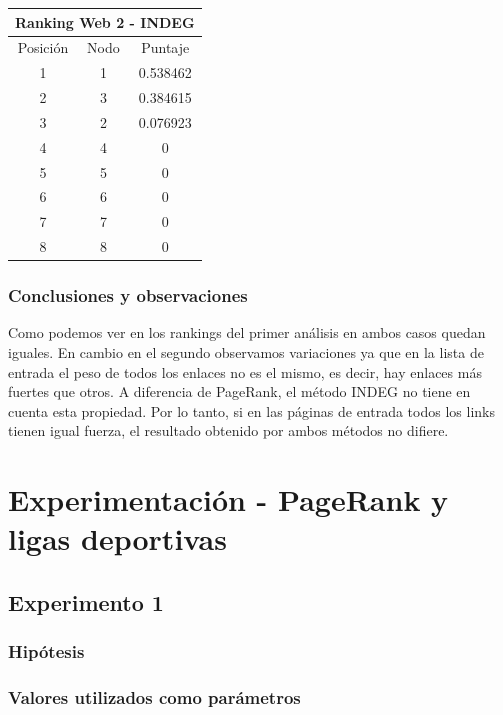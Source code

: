 \begin{center}
      			\begin{tabular}{c|c|c}
		      		\hline
		  				\multicolumn{3}{c}{Ranking Web 2 - INDEG} \\
		 			\hline
        			Posición & Nodo & Puntaje \\ \hline
         			1 & 1 & 0.538462 \\
        			2 & 3 & 0.384615 \\
        			3 & 2 & 0.076923 \\
        			4 & 4 & 0 \\
        			5 & 5 & 0 \\
        			6 & 6 & 0 \\
        			7 & 7 & 0 \\
        			8 & 8 & 0 \\
      			\end{tabular}
    	\end{center}

		\subsubsection*{Conclusiones y observaciones} 
		Como podemos ver en los rankings del primer análisis en ambos casos quedan iguales. En cambio en el segundo observamos variaciones ya que en la lista de entrada el peso de todos los enlaces no es el mismo, es decir, hay enlaces más fuertes que otros. A diferencia de PageRank, el método INDEG no tiene en cuenta esta propiedad. Por lo tanto, si en las páginas de entrada todos los links tienen igual fuerza, el resultado obtenido por ambos métodos no difiere. 


\section{Experimentación - PageRank y ligas deportivas}
	
	\subsection{Experimento 1}

		\subsubsection*{Hipótesis}
		
		\subsubsection*{Valores utilizados como parámetros} 

